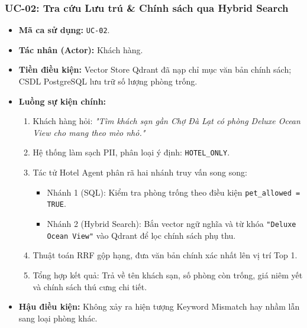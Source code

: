 \subsubsection{UC-02: Tra cứu Lưu trú \& Chính sách qua Hybrid Search}
\begin{itemize}
    \item \textbf{Mã ca sử dụng:} \texttt{UC-02}.
    \item \textbf{Tác nhân (Actor):} Khách hàng.
    \item \textbf{Tiền điều kiện:} Vector Store Qdrant đã nạp chỉ mục văn bản chính sách; CSDL PostgreSQL lưu trữ số lượng phòng trống.
    \item \textbf{Luồng sự kiện chính:}
    \begin{enumerate}
        \item Khách hàng hỏi: \textit{"Tìm khách sạn gần Chợ Đà Lạt có phòng Deluxe Ocean View cho mang theo mèo nhỏ."}
        \item Hệ thống làm sạch PII, phân loại ý định: \texttt{HOTEL\_ONLY}.
        \item Tác tử Hotel Agent phân rã hai nhánh truy vấn song song:
        \begin{itemize}
            \item Nhánh 1 (SQL): Kiểm tra phòng trống theo điều kiện \texttt{pet\_allowed = TRUE}.
            \item Nhánh 2 (Hybrid Search): Bắn vector ngữ nghĩa và từ khóa \texttt{"Deluxe Ocean View"} vào Qdrant để lọc chính sách phụ thu.
        \end{itemize}
        \item Thuật toán RRF gộp hạng, đưa văn bản chính xác nhất lên vị trí Top 1.
        \item Tổng hợp kết quả: Trả về tên khách sạn, số phòng còn trống, giá niêm yết và chính sách thú cưng chi tiết.
    \end{enumerate}
    \item \textbf{Hậu điều kiện:} Không xảy ra hiện tượng Keyword Mismatch hay nhầm lẫn sang loại phòng khác.
\end{itemize}

